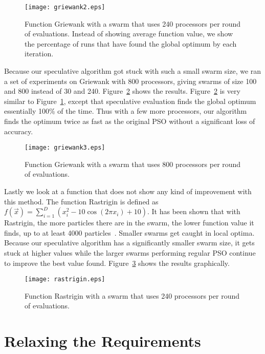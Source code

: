 \documentclass[journal,letterpaper]{IEEEtran}
\newcommand{\fig}[1]{Figure~\ref{fig:#1}}
\begin{document}
\begin{figure}
  \centering
  \texttt{[image: griewank2.eps]}
  \caption{Function Griewank with a swarm that uses 240 processors per round of
  evaluations.  Instead of showing average function value, we show the
  percentage of runs that have found the global optimum by each iteration.}
  \label{fig:basic-griewank2}
\end{figure}

Because our speculative algorithm got stuck with such a small swarm size, we
ran a set of experiments on Griewank with 800 processors, giving swarms of size
100 and 800 instead of 30 and 240.  \fig{basic-griewank3} shows the results.
\fig{basic-griewank3} is very similar to \fig{basic-griewank2}, except that
speculative evaluation finds the global optimum essentially 100\% of the time.
Thus with a few more processors, our algorithm finds the optimum twice as fast
as the original PSO without a significant loss of accuracy.

\begin{figure}
  \centering
  \texttt{[image: griewank3.eps]}
  \caption{Function Griewank with a swarm that uses 800 processors per round of
  evaluations.}
  \label{fig:basic-griewank3}
\end{figure}

Lastly we look at a function that does not show any kind of improvement with
this method.  The function Rastrigin is defined as $f(\Vec{x}) = \sum_{i=1}^D
\left(x_i^2 - 10\cos\left(2\pi x_i\right) + 10\right)$.  It has been shown that
with Rastrigin, the more particles there are in the swarm, the lower function
value it finds, up to at least 4000 particles~\cite{mcnabb-cec09}.  Smaller
swarms get caught in local optima.  Because our speculative algorithm has a
significantly smaller swarm size, it gets stuck at higher values while the
larger swarms performing regular PSO continue to improve the best value found.
\fig{rastrigin} shows the results graphically.

\begin{figure}
  \centering
  \texttt{[image: rastrigin.eps]}
  \caption{Function Rastrigin with a swarm that uses 240 processors per round
  of evaluations.}
  \label{fig:rastrigin}
\end{figure}

\section{Relaxing the Requirements}
\label{sec:relax}
\end{document}
